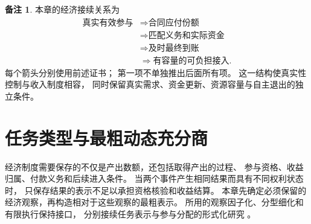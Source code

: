 \documentclass[UTF8,12pt,a4paper,openany,fontset=none,zihao=false]{ctexrep}
\theoremstyle{definition}
\newtheorem{remark}{备注}[chapter]
\newcommand{\1}{\mathbf 1}
\begin{document}
\begin{remark}
本章的经济接续关系为
\[
\begin{aligned}
 \text{真实有效参与}
 &\Longrightarrow\text{合同应付份额}\\
 &\Longrightarrow\text{匹配义务和实际资金}\\
 &\Longrightarrow\text{及时最终到账}\\
 &\Longrightarrow\text{有容量的可负担接入}.
\end{aligned}
\]
每个箭头分别使用前述证书；
第一项不单独推出后面所有项。
这一结构使真实性控制与收入制度相容，
同时保留真实需求、资金更新、资源容量与自主退出的独立条件。
\end{remark}

\chapter{任务类型与最粗动态充分商}
\label{q:chapter}

经济制度需要保存的不仅是产出数额，还包括取得产出的过程、
参与资格、收益归属、付款义务和后续进入条件。
当两个事件产生相同结果而具有不同权利状态时，
只保存结果的表示不足以承担资格核验和收益结算。
本章先确定必须保留的经济观察，再构造相对于这些观察的最粗表示。
所用的观察因子化、分型细化和有限执行保持接口，
分别接续任务表示与参与分配的形式化研究
\cite{InternalTheory,InternalEconomics}。
\end{document}
